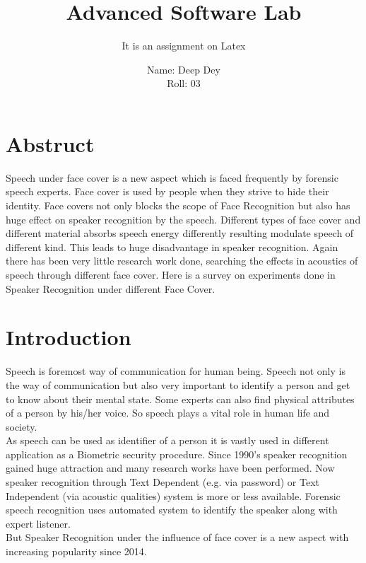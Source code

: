 \documentclass[12pt]{scrartcl}
\title{Advanced Software Lab}
\subtitle{It is an assignment on Latex}
\author{Name: Deep Dey\\Roll: 03}
\date{}
\begin{document}
	\maketitle
	\pagebreak
	\tableofcontents
	\pagebreak
	\listoffigures
	\pagebreak
	\listoftables
	\pagebreak
	
\section*{Abstruct}
	Speech under face cover is a new aspect which is faced frequently by forensic
speech experts. Face cover is used by people when they strive to hide their identity.
Face covers not only blocks the scope of Face Recognition but also has huge effect on
speaker recognition by the speech. Different types of face cover and different material
absorbs speech energy differently resulting modulate speech of different kind. This
leads to huge disadvantage in speaker recognition. Again there has been very little
research work done, searching the effects in acoustics of speech through different
face cover. Here is a survey on experiments done in Speaker Recognition under
different Face Cover.	

\pagebreak
	
\section{Introduction}
Speech is foremost way of communication for human being. Speech not only is the
way of communication but also very important to identify a person and get to know about their mental state.\cite{lutz2001programming}\cite{pedregosa2011scikit}\cite{rossum1995python} Some experts can also find physical attributes of a person by
his/her voice. So speech plays a vital role in human life and society.\\

As speech can be used as identifier of a person it is vastly used in different
application as a Biometric security procedure. Since 1990’s speaker recognition gained
huge attraction and many research works have been performed. Now speaker
recognition through Text Dependent (e.g. via password) or Text Independent (via
acoustic qualities) system is more or less available. Forensic speech recognition uses automated system to identify the speaker along with expert listener.\\

But Speaker Recognition under the influence of face cover is a new aspect with
increasing popularity since 2014.
\end{document}
